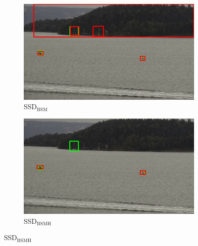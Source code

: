 \begin{figure}
\begin{subfigure}{.5\textwidth}
  \centering
  \includegraphics[width=0.9\linewidth]{results/case_buildings/bigbox_bcbf/SSD2/selected_08_09_frame4530.jpg}
  \caption{SSD$_{\text{BSM}}$}
  \label{fig:sfig1}
\end{subfigure}%
\begin{subfigure}{.5\textwidth}
  \centering
  \includegraphics[width=.9\linewidth]{results/case_buildings/bigbox_bcbf/SSD3/selected_08_09_frame4530.jpg}
  \caption{SSD$_{\text{BSMH}}$}
  \label{fig:sfig2}
\end{subfigure}


\end{figure}
